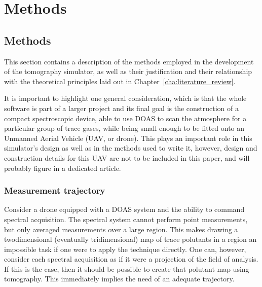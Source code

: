 \chapter{Methods}
\label{cha:methods}


\section{Methods}%
\label{sec:methods}

This section contains a description of the methods employed in the
development of the tomography simulator, as well as their justification
and their relationship with the theoretical principles laid out in
Chapter~\ref{cha:literature_review}.

It is important to highlight one general consideration, which is that
the whole software is part of a larger project and its final goal is the
construction of a compact spectroscopic device, able to use DOAS to scan
the atmosphere for a particular group of trace gases, while being small
enough to be fitted onto an Unmanned Aerial Vehicle (UAV, or drone).
This plays an important role in this simulator's design as well as in
the methods used to write it, however, design and construction details
for this UAV are not to be included in this paper, and will probably
figure in a dedicated article.

\subsection{Measurement trajectory}%
\label{sub:measurement_trajectory}

Consider a drone equipped with a DOAS system and the ability to command
spectral acquisition. The spectral system cannot perform point
measurements, but only averaged measurements over a large region. This
makes drawing a twodimensional (eventually tridimensional) map of trace
polutants in a region an impossible task if one were to apply the
technique directly. One can, however, consider each spectral acquisition
as if it were a projection of the field of analysis. If this is the
case, then it should be possible to create that polutant map using
tomography. This immediately implies the need of an adequate trajectory.

